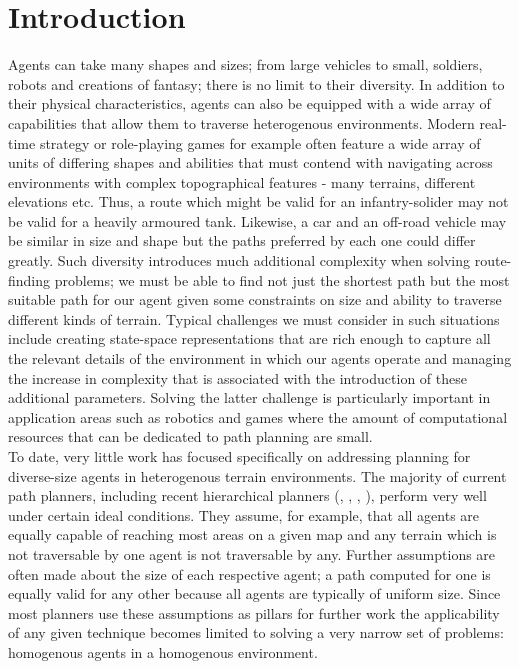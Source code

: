 \section{Introduction}
Agents can take many shapes and sizes; from large vehicles to small, soldiers, robots and creations of fantasy; there is no limit to their diversity. In addition to their physical characteristics, agents can also be equipped with a wide array of capabilities that allow them to traverse heterogenous environments. 
Modern real-time strategy or role-playing games for example often feature a wide array of units of differing shapes and abilities that must contend with navigating across environments with complex topographical features - many terrains, different elevations etc. Thus, a route which might be valid for an infantry-solider may not be valid for a heavily armoured tank. Likewise, a car and an off-road vehicle may be similar in size and shape but the paths preferred by each one could differ greatly. 
Such diversity introduces much additional complexity when solving route-finding problems; we must be able to find not just the shortest path but the most suitable path for our agent given some constraints on size and ability to traverse different kinds of terrain. 
Typical challenges we must consider in such situations include creating state-space representations that are rich enough to capture all the relevant details of the environment in which our agents operate and managing the increase in complexity that is associated with the introduction of these additional parameters. 
Solving the latter challenge is particularly important in application areas such as robotics and games where the amount of computational resources that can be dedicated to path planning are small.\\
To date, very little work has focused specifically on addressing planning for diverse-size agents in heterogenous terrain environments. The majority of current path planners, including recent hierarchical planners (\cite{botea04}, \cite{sturtevant05}, \cite{demyen07}, \cite{geraerts07}), perform very well under certain ideal conditions. They assume, for example, that all agents are equally capable of reaching most areas on a given map and any terrain which is not traversable by one agent is not traversable by any. 
Further assumptions are often made about the size of each respective agent; a path computed for one is equally valid for any other because all agents are typically of uniform size. 
Since most planners use these assumptions as pillars for further work the applicability of any given technique becomes limited to solving a very narrow set of problems: homogenous agents in a homogenous environment. \\
